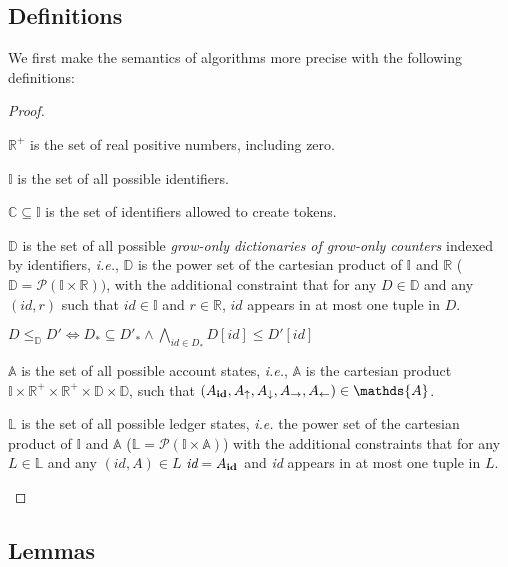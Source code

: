 \documentclass[9pt]{article}   	%
\begin{document}
\subsection{Definitions}

We first make the semantics of algorithms more precise with the following definitions:
\begin{proof}
	\begin{pfenum}
		\item $\mathds{R}^+$ is the set of real positive numbers, including zero.
		\item $\mathds{I}$ is the set of all possible identifiers.
		\item $\mathds{C} \subseteq \mathds{I}$ is the set of identifiers allowed to create tokens.
		\item $\mathds{D}$ is the set of all possible \textit{grow-only dictionaries of grow-only counters} indexed by identifiers, \textit{i.e.}, $\mathds{D}$ is the power set of the cartesian product of $\mathds{I}$ and $\mathds{R}$ ($\mathds{D} = \mathcal{P}(\mathds{I} \times \mathds{R}))$, with the additional constraint that for any $D \in \mathds{D}$ and any $(\textit{id},r)$ such that $\textit{id} \in \mathds{I}$ and $r \in \mathds{R}$, $id$ appears in at most one tuple in $D$.
		\item $D \leq_\mathds{D} D' \Leftrightarrow D_* \subseteq D'_* \wedge \bigwedge\limits_{id \in D_*} D[id] \leq D'[id] $
		\item $\mathds{A}$ is the set of all possible account states, \textit{i.e.}, $\mathds{A}$ is the cartesian product $\mathds{I} \times \mathds{R}^+ \times \mathds{R}^+ \times \mathds{D} \times \mathds{D}$, such that $(A_{\footnotesize \textbf{id}}, A_\uparrow, A_\downarrow, A_\rightarrow, A_\leftarrow) \in \mathds{A}$. 
		\item $\mathds{L}$ is the set of all possible ledger states, \textit{i.e.} the power set of the cartesian product of $\mathds{I}$ and $\mathds{A}$ ($\mathds{L} = \mathcal{P}(\mathds{I} \times \mathds{A})$) with the additional constraints that for any $L \in \mathds{L}$ and any $(\textit{id}, A) \in L$ $\textit{id} = A_{\footnotesize \textbf{id}}$ and \textit{id} appears in at most one tuple in $L$.
	\end{pfenum}
\end{proof}

\subsection{Lemmas}
\end{document}
